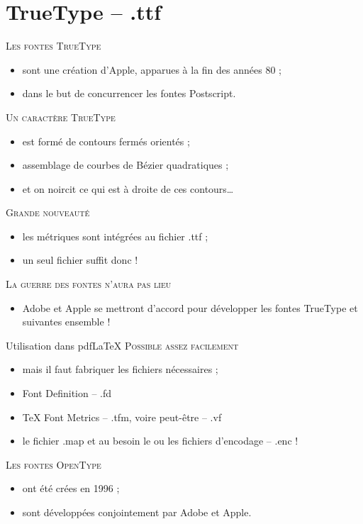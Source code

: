 \documentclass[12pt,a4paper,twocolumn]{book} %
\begin{document}
{                  \section{TrueType -- .ttf}		
	                  {\textsc{Les fontes TrueType}}
		          \begin{itemize}
			  \item sont une création d'Apple, apparues à la fin des années 80 ;
			  \item dans le but de concurrencer les fontes Postscript.
		          \end{itemize}	
	                      {\textsc{Un caractère TrueType}}
		              \begin{itemize}
			      \item est formé de contours fermés orientés ;
			      \item assemblage de courbes de Bézier quadratiques ;
			      \item et on noircit ce qui est à droite de ces contours\dots
		              \end{itemize}	
                                  {\textsc{Grande nouveauté}}
		                  \begin{itemize}
			          \item les métriques sont intégrées au fichier .ttf ;
			          \item un seul fichier suffit donc !
		                  \end{itemize}	
                                      {\textsc{La guerre des fontes n'aura pas lieu}}
		                      \begin{itemize}
			              \item Adobe et Apple se mettront d'accord pour développer les fontes TrueType et suivantes ensemble !
		                      \end{itemize}		


                                      Utilisation dans pdf\LaTeX		
                                      {\textsc{Possible assez facilement}}
		                      \begin{itemize}
			              \item mais il faut fabriquer les fichiers nécessaires ;
			              \item Font Definition -- .fd
			              \item TeX Font Metrics -- .tfm, voire peut-être -- .vf
			              \item le fichier .map et au besoin le ou les fichiers d'encodage -- .enc !
		                      \end{itemize}
                                          {\textsc{Les fontes OpenType}}
		                          \begin{itemize}
			                  \item ont été crées en 1996 ;
			                  \item sont développées conjointement par Adobe et Apple.
		                          \end{itemize}
		                          
}
\end{document}
